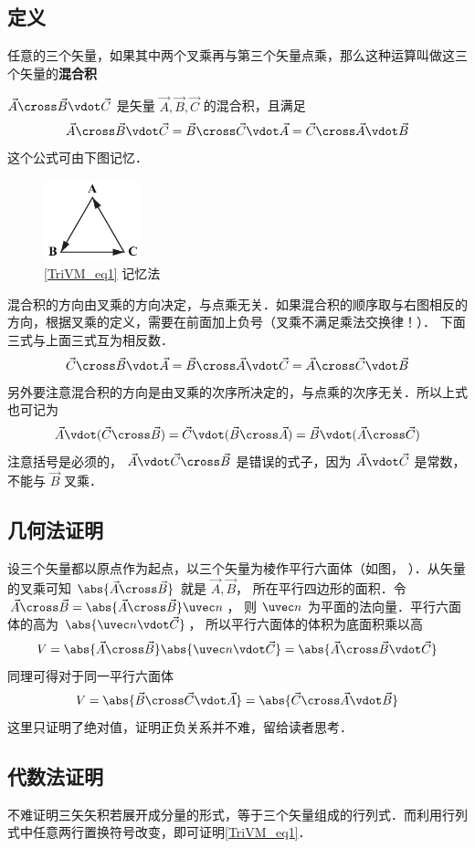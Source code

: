 
\subsection{定义}

任意的三个矢量，如果其中两个叉乘再与第三个矢量点乘，那么这种运算叫做这三个矢量的\textbf{混合积}

$\vec A \cross \vec B \vdot \vec C$ 是矢量 $\vec A, \vec B, \vec C$ 的混合积，且满足
\begin{equation}\label{TriVM_eq1}
\vec A \cross \vec B \vdot \vec C = \vec B \cross \vec C \vdot \vec A = \vec C \cross \vec A \vdot \vec B 
\end{equation} 
这个公式可由下图记忆．
\begin{figure}[ht]
\centering
\includegraphics[width=0.25\textwidth]{./figures/TriVM.pdf}
\caption{\autoref{TriVM_eq1} 记忆法}
\end{figure}
混合积的方向由叉乘的方向决定，与点乘无关．如果混合积的顺序取与右图相反的方向，根据叉乘的定义，需要在前面加上负号（叉乘不满足乘法交换律！）． 下面三式与上面三式互为相反数．
\begin{equation}
\vec C \cross \vec B \vdot \vec A = \vec B \cross \vec A \vdot \vec C = \vec A \cross \vec C \vdot \vec B
\end{equation} 
另外要注意混合积的方向是由叉乘的次序所决定的，与点乘的次序无关．所以上式也可记为
 \begin{equation}
\vec A \vdot (\vec C \cross \vec B) = \vec C \vdot (\vec B \cross \vec A) = \vec B \vdot (\vec A \cross \vec C)
\end{equation} 
注意括号是必须的， $\vec A \vdot \vec C \cross \vec B$ 是错误的式子，因为 $\vec A \vdot \vec C$ 是常数，不能与 $\vec B$ 叉乘．


\subsection{几何法证明}

设三个矢量都以原点作为起点，以三个矢量为棱作平行六面体（如图，%
）．从矢量的叉乘可知 $\abs{\vec A \cross \vec B}$ 就是 $\vec A,\vec B$，  所在平行四边形的面积．令 $\vec A \cross \vec B = \abs{\vec A \cross \vec B} \uvec n$， 则 $\uvec n$ 为平面的法向量．平行六面体的高为 $\abs{\uvec n \vdot \vec C}$， 所以平行六面体的体积为底面积乘以高
\begin{equation}
V = \abs{\vec A \cross \vec B} \abs{\uvec n \vdot \vec C} = \abs{\vec A \cross \vec B \vdot \vec C}
\end{equation}
同理可得对于同一平行六面体
\begin{equation}
V = \abs{\vec B \cross \vec C \vdot \vec A} = \abs{\vec C \cross \vec A \vdot \vec B} 
\end{equation}  
这里只证明了绝对值，证明正负关系并不难，留给读者思考．

\subsection{代数法证明}
不难证明三矢矢积若展开成分量的形式，等于三个矢量组成的行列式．而利用行列式中任意两行置换符号改变，即可证明\autoref{TriVM_eq1}．


